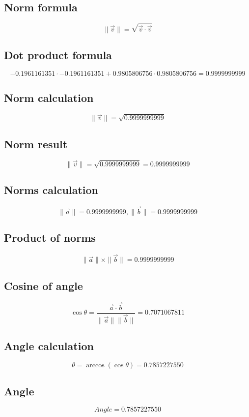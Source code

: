 \documentclass{article}
\begin{document}
\subsection*{ \vspace{1em} Norm formula}
\[
\|\vec{v}\| = \sqrt{\vec{v} \cdot \vec{v}}
\]
\subsection*{ \vspace{1em} Dot product formula}
\[
-0.1961161351 \cdot -0.1961161351 + 0.9805806756 \cdot 0.9805806756 = 0.9999999999
\]
\subsection*{ \vspace{1em} Norm calculation}
\[
\|\vec{v}\| = \sqrt{0.9999999999}
\]
\subsection*{ \vspace{1em} Norm result}
\[
\|\vec{v}\| = \sqrt{0.9999999999} = 0.9999999999
\]
\subsection*{ \vspace{1em} Norms calculation}
\[
\|\vec{a}\| = 0.9999999999, \|\vec{b}\| = 0.9999999999
\]
\subsection*{ \vspace{1em} Product of norms}
\[
\|\vec{a}\| \times \|\vec{b}\| = 0.9999999999
\]
\subsection*{ \vspace{1em} Cosine of angle}
\[
\cos\theta = \frac{\vec{a} \cdot \vec{b}}{\|\vec{a}\| \|\vec{b}\|} = 0.7071067811
\]
\subsection*{ \vspace{1em} Angle calculation}
\[
\theta = \arccos(\cos\theta) = 0.7857227550
\]
\subsection*{ \vspace{1em} Angle}
\[
Angle = 0.7857227550
\]
\bigskip
\end{document}
